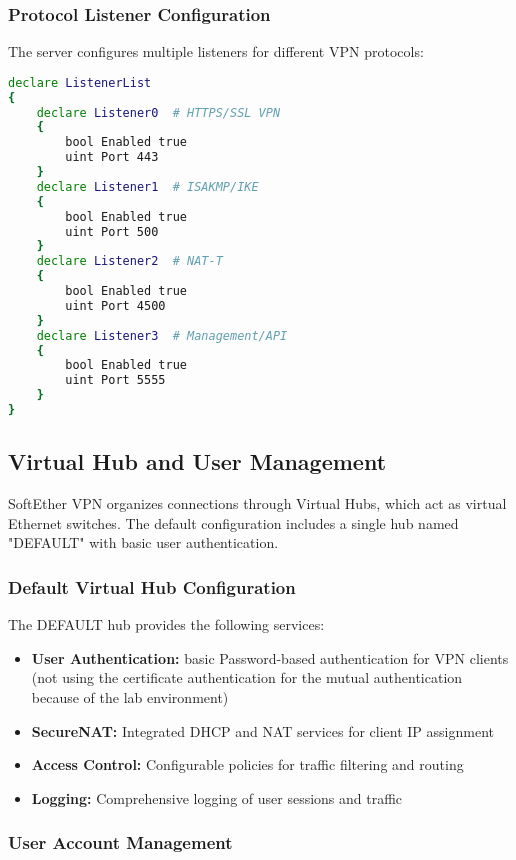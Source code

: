 \subsubsection{Protocol Listener Configuration}

The server configures multiple listeners for different VPN protocols:

\begin{lstlisting}[language=bash]
declare ListenerList
{
    declare Listener0  # HTTPS/SSL VPN
    {
        bool Enabled true
        uint Port 443
    }
    declare Listener1  # ISAKMP/IKE
    {
        bool Enabled true
        uint Port 500
    }
    declare Listener2  # NAT-T
    {
        bool Enabled true
        uint Port 4500
    }
    declare Listener3  # Management/API
    {
        bool Enabled true
        uint Port 5555
    }
}
\end{lstlisting}

\subsection{Virtual Hub and User Management}

SoftEther VPN organizes connections through Virtual Hubs, which act as virtual Ethernet switches. The default configuration includes a single hub named "DEFAULT" with basic user authentication.

\subsubsection{Default Virtual Hub Configuration}

The DEFAULT hub provides the following services:

\begin{itemize}
    \item \textbf{User Authentication:} basic Password-based authentication for VPN clients (not using the certificate authentication for the mutual authentication because of the lab environment)
    \item \textbf{SecureNAT:} Integrated DHCP and NAT services for client IP assignment
    \item \textbf{Access Control:} Configurable policies for traffic filtering and routing
    \item \textbf{Logging:} Comprehensive logging of user sessions and traffic
\end{itemize}

\subsubsection{User Account Management}

